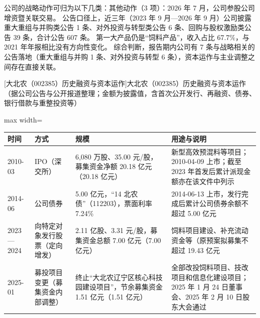  公司的战略动作可归为以下几类：其他动作（3 项）：2026 年 7 月，公司参股公司增资暨关联交易。 公告口径上，近三年（2023 年 9 月---2026 年 9 月）公司披露重大重组与并购类公告 1 条、对外投资与转型类公告 6 条、回购与股权激励类公告 39 条，合计公告 607 条。 第一大产品仍是“饲料产品”，收入占比 67.7\%，与 2021 年年报相比没有方向性变化。 综合判断，报告期内公司有 7 条与战略相关的公告落地（重大重组与并购 1 条、对外投资与转型 6 条），资本运作与主业调整之间存在直接关联。

\begin{center}\small\setlength{\tabcolsep}{4pt}
[大北农（002385）历史融资与资本运作]{大北农（002385）历史融资与资本运作（据公司公告与公开报道整理；金额为披露值，含首次公开发行、再融资、债券、银行借款与重整投资等）}
\begin{adjustbox}{max width=\textwidth}
\begin{tabular}{@{}p{1.45cm}p{2.55cm}p{4.05cm}p{4.95cm}@{}}
\toprule
时间 & 方式 & 规模 & 用途与说明 \\
\midrule
2010-03 & IPO（深交所） & 6,\allowbreak{}080 万股、\allowbreak{}35.00 元/\allowbreak{}股，\allowbreak{}募集资金净额 20.18 亿元（20.18 亿元） & 新型高效预混料等项目；2010-04-09 上市；截至 2023 年首发后累计派现金额亦在该文件中列示 \\
2014-06 & 公司债券 & 5.00 亿元，\allowbreak{}“14 北农债”（112203），\allowbreak{}票面利率 7.24\% & 2014-06-13 上市，\allowbreak{}发行完成后累计公司债券余额不超过 5.00 亿元 \\
2023—2024 & 向特定对象发行股票（定向增发） & 2.11 亿股、\allowbreak{}3.31 元/\allowbreak{}股，\allowbreak{}募集资金总额 7.00 亿元（7.00 亿元） & 饲料项目建设、\allowbreak{}补充流动资金等（原预案拟募集不超过 19.43 亿元 \\
2025-01 & 募投项目变更（募集资金内部调整） & 终止“大北农辽宁区核心科技园建设项目”，\allowbreak{}节余募集资金 1.51 亿元（1.51 亿元） & 全部改投饲料项目、\allowbreak{}技改项目和信息化建设项目；2025 年 1 月 24 日董事会、\allowbreak{}2025 年 2 月 10 日股东大会通过 \\
\bottomrule
\end{tabular}
\end{adjustbox}
\end{center}

